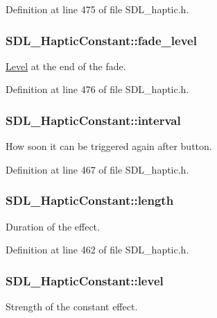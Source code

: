 Definition at line 475 of file S\-D\-L\-\_\-haptic.\-h.

\hypertarget{struct_s_d_l___haptic_constant_a49f6499c89f3e494efbe92f12277c949}{
\subsubsection[{fade\-\_\-level}]{ S\-D\-L\-\_\-\-Haptic\-Constant\-::fade\-\_\-level}}\label{struct_s_d_l___haptic_constant_a49f6499c89f3e494efbe92f12277c949}
\hyperlink{class_level}{Level} at the end of the fade. 

Definition at line 476 of file S\-D\-L\-\_\-haptic.\-h.

\hypertarget{struct_s_d_l___haptic_constant_ab1f7f0df856f4cf1fdf937cb886226b4}{
\subsubsection[{interval}]{ S\-D\-L\-\_\-\-Haptic\-Constant\-::interval}}\label{struct_s_d_l___haptic_constant_ab1f7f0df856f4cf1fdf937cb886226b4}
How soon it can be triggered again after button. 

Definition at line 467 of file S\-D\-L\-\_\-haptic.\-h.

\hypertarget{struct_s_d_l___haptic_constant_aeb994c356b1d236b060f277d157e98ec}{
\subsubsection[{length}]{ S\-D\-L\-\_\-\-Haptic\-Constant\-::length}}\label{struct_s_d_l___haptic_constant_aeb994c356b1d236b060f277d157e98ec}
Duration of the effect. 

Definition at line 462 of file S\-D\-L\-\_\-haptic.\-h.

\hypertarget{struct_s_d_l___haptic_constant_a5b095eea77464623ed57af15f29f4ca6}{
\subsubsection[{level}]{ S\-D\-L\-\_\-\-Haptic\-Constant\-::level}}\label{struct_s_d_l___haptic_constant_a5b095eea77464623ed57af15f29f4ca6}
Strength of the constant effect. 

